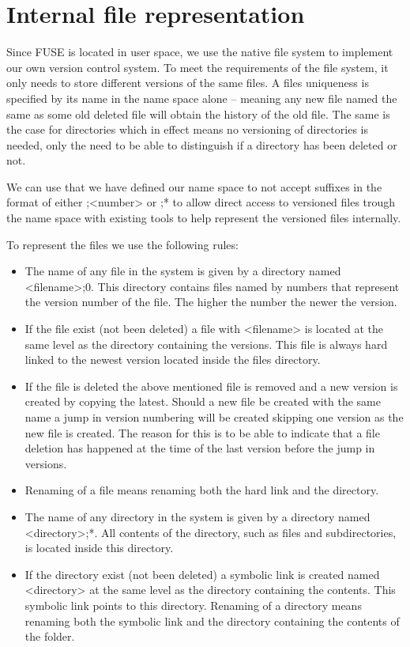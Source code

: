 \documentclass[12pt]{article}
\begin{document}
\section{Internal file representation}

Since FUSE is located in user space, we use the native file system to
implement our own version control system. To meet the requirements of
the file system, it only needs to store different versions of the same
files. A files uniqueness is specified by its name in the name space
alone – meaning any new file named the same as some old deleted file
will obtain the history of the old file. The same is the case for
directories which in effect means no versioning of directories is
needed, only the need to be able to distinguish if a directory has
been deleted or not.

We can use that we have defined our name space to not accept suffixes
in the format of either ;<number> or ;* to allow direct access to
versioned files trough the name space with existing tools to help
represent the versioned files internally.

To represent the files we use the following rules:

\begin{itemize}
\item The name of any file in the system is given by a directory named
  <filename>;0. This directory contains files named by numbers that
  represent the version number of the file. The higher the number the
  newer the version.
\item If the file exist (not been deleted) a file with <filename> is
  located at the same level as the directory containing the
  versions. This file is always hard linked to the newest version
  located inside the files directory.
\item If the file is deleted the above mentioned file is removed and a
  new version is created by copying the latest. Should a new file be
  created with the same name a jump in version numbering will be
  created skipping one version as the new file is created. The reason
  for this is to be able to indicate that a file deletion has happened
  at the time of the last version before the jump in versions.
\item Renaming of a file means renaming both the hard link and the
  directory.
\item The name of any directory in the system is given by a directory
  named <directory>;*. All contents of the directory, such as files
  and subdirectories, is located inside this directory.
\item If the directory exist (not been deleted) a symbolic link is
  created named <directory> at the same level as the directory
  containing the contents. This symbolic link points to this
  directory.  Renaming of a directory means renaming both the symbolic
  link and the directory containing the contents of the folder.
\end{itemize}
\end{document}
